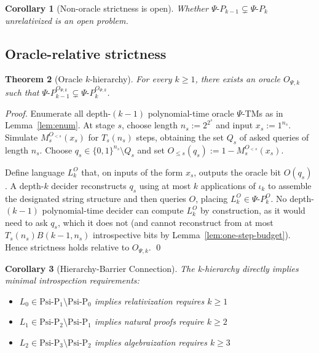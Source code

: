 \documentclass[11pt]{article}
\newtheorem{theorem}{Theorem}[section]
\newtheorem{corollary}[theorem]{Corollary}
\theoremstyle{definition}
\newcommand{\PSi}{\Psi}
\newcommand{\bits}{\{0,1\}}
\begin{document}
\begin{corollary}[Non-oracle strictness is open]
\label{cor:strictness-open}
Whether $\Psi\text{-}P_{k-1}\subsetneq \Psi\text{-}P_k$ unrelativized is an open problem.
\end{corollary}

\subsection{Oracle-relative strictness}

\begin{theorem}[Oracle $k$-hierarchy]
\label{thm:oracle-k-hierarchy}
For every $k\ge1$, there exists an oracle $O_{\PSi,k}$ such that $\Psi\text{-}P_{k-1}^{O_{\PSi,k}} \subsetneq \Psi\text{-}P_{k}^{O_{\PSi,k}}$.
\end{theorem}
\begin{proof}
Enumerate all depth-$(k{-}1)$ polynomial-time oracle $\PSi$-TMs as in Lemma~\ref{lem:enum}. At stage $s$, choose length $n_s:=2^{2^s}$ and input $x_s:=1^{n_s}$. Simulate $M_s^{O_{<s}}(x_s)$ for $T_s(n_s)$ steps, obtaining the set $Q_s$ of asked queries of length $n_s$. Choose $q_s\in\bits^{n_s}\setminus Q_s$ and set $O_{\le s}(q_s):=1-M_s^{O_{<s}}(x_s)$.

Define language $L_k^{O}$ that, on inputs of the form $x_s$, outputs the oracle bit $O(q_s)$. A depth-$k$ decider reconstructs $q_s$ using at most $k$ applications of $\iota_k$ to assemble the designated string structure and then queries $O$, placing $L_k^{O}\in\Psi\text{-}P_{k}^{O}$. No depth-$(k{-}1)$ polynomial-time decider can compute $L_k^{O}$ by construction, as it would need to ask $q_s$, which it does not (and cannot reconstruct from at most $T_s(n_s) B(k{-}1,n_s)$ introspective bits by Lemma~\ref{lem:one-step-budget}). Hence strictness holds relative to $O_{\PSi,k}$. \qed
\end{proof}

\begin{corollary}[Hierarchy-Barrier Connection]
The k-hierarchy directly implies minimal introspection requirements:
\begin{itemize}
    \item $L_0 \in \text{Psi-P}_1 \setminus \text{Psi-P}_0$ 
          implies relativization requires $k \geq 1$
    \item $L_1 \in \text{Psi-P}_2 \setminus \text{Psi-P}_1$ 
          implies natural proofs require $k \geq 2$  
    \item $L_2 \in \text{Psi-P}_3 \setminus \text{Psi-P}_2$ 
          implies algebraization requires $k \geq 3$
\end{itemize}
\end{corollary}
\end{document}
